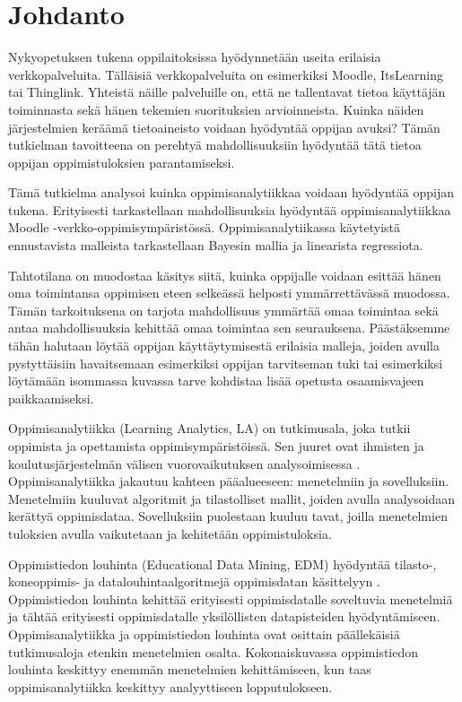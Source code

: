 \chapter{Johdanto\label{johdanto}}

Nykyopetuksen tukena oppilaitoksissa hyödynnetään useita erilaisia verkkopalveluita. Tälläisiä verkkopalveluita on esimerkiksi Moodle, ItsLearning tai Thinglink. Yhteistä näille palveluille on, että ne tallentavat tietoa käyttäjän toiminnasta sekä hänen tekemien suorituksien arvioinneista. Kuinka näiden järjestelmien keräämä tietoaineisto voidaan hyödyntää oppijan avuksi? Tämän tutkielman tavoitteena on perehtyä mahdollisuuksiin hyödyntää tätä tietoa oppijan oppimistuloksien parantamiseksi.

Tämä tutkielma analysoi kuinka oppimisanalytiikkaa voidaan hyödyntää oppijan tukena. Erityisesti tarkastellaan mahdollisuuksia hyödyntää oppimisanalytiikkaa Moodle -verkko-oppimisympäristössä. Oppimisanalytiikassa käytetyistä ennustavista malleista tarkastellaan Bayesin mallia ja linearista regressiota.

Tahtotilana on muodostaa käsitys siitä, kuinka oppijalle voidaan esittää hänen oma toimintansa oppimisen eteen selkeässä helposti ymmärrettävässä muodossa. Tämän tarkoituksena on tarjota mahdollisuus ymmärtää omaa toimintaa sekä antaa mahdollisuuksia kehittää omaa toimintaa sen seurauksena. Päästäksemme tähän halutaan löytää oppijan käyttäytymisestä erilaisia malleja, joiden avulla pystyttäisiin havaitsemaan esimerkiksi oppijan tarvitseman tuki tai esimerkiksi löytämään isommassa kuvassa tarve kohdistaa lisää opetusta osaamisvajeen paikkaamiseksi.

Oppimisanalytiikka (Learning Analytics, LA) \citep{longPenetratingFogAnalytics2011} on tutkimusala, joka tutkii oppimista ja opettamista oppimisympäristöissä. Sen juuret ovat ihmisten ja koulutusjärjestelmän välisen vuorovaikutuksen analysoimisessa \citep{siemensLearningAnalyticsEmergence2013}. Oppimisanalytiikka jakautuu kahteen pääalueeseen: menetelmiin ja sovelluksiin. Menetelmiin kuuluvat algoritmit ja tilastolliset mallit, joiden avulla analysoidaan kerättyä oppimisdataa. Sovelluksiin puolestaan kuuluu tavat, joilla menetelmien tuloksien avulla vaikutetaan ja kehitetään oppimistuloksia.

Oppimistiedon louhinta (Educational Data Mining, EDM) hyödyntää tilasto-, koneoppimis- ja datalouhintaalgoritmejä oppimisdatan käsittelyyn \citep{romeroEducationalDataMining2010,siemensLearningAnalyticsEmergence2013}. Oppimistiedon louhinta kehittää erityisesti oppimisdatalle soveltuvia menetelmiä ja tähtää erityisesti oppimisdatalle yksilöllisten datapisteiden hyödyntämiseen. Oppimisanalytiikka ja oppimistiedon louhinta ovat osittain päällekäisiä tutkimusaloja etenkin menetelmien osalta. Kokonaiskuvassa oppimistiedon louhinta keskittyy enemmän menetelmien kehittämiseen, kun taas oppimisanalytiikka keskittyy analyyttiseen lopputulokseen.

